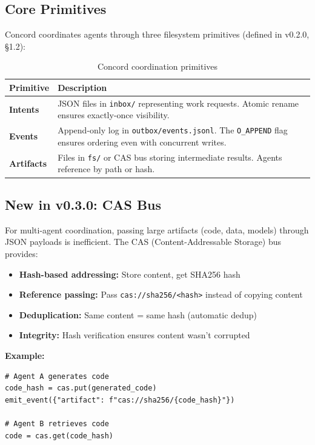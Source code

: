 \documentclass[11pt]{article}
\begin{document}
\subsection{Core Primitives}

Concord coordinates agents through three filesystem primitives (defined in v0.2.0, §1.2):

\begin{table}[h]
\centering
\begin{tabular}{p{3cm}p{10cm}}
\toprule
\textbf{Primitive} & \textbf{Description} \\
\midrule
\textbf{Intents} & JSON files in \texttt{inbox/} representing work requests. Atomic rename ensures exactly-once visibility. \\
\textbf{Events} & Append-only log in \texttt{outbox/events.jsonl}. The \texttt{O\_APPEND} flag ensures ordering even with concurrent writes. \\
\textbf{Artifacts} & Files in \texttt{fs/} or CAS bus storing intermediate results. Agents reference by path or hash. \\
\bottomrule
\end{tabular}
\caption{Concord coordination primitives}
\end{table}

\subsection{New in v0.3.0: CAS Bus}

For multi-agent coordination, passing large artifacts (code, data, models) through JSON payloads is inefficient. The CAS (Content-Addressable Storage) bus provides:

\begin{itemize}
\item \textbf{Hash-based addressing:} Store content, get SHA256 hash
\item \textbf{Reference passing:} Pass \texttt{cas://sha256/<hash>} instead of copying content
\item \textbf{Deduplication:} Same content = same hash (automatic dedup)
\item \textbf{Integrity:} Hash verification ensures content wasn't corrupted
\end{itemize}

\textbf{Example:}
\begin{lstlisting}
# Agent A generates code
code_hash = cas.put(generated_code)
emit_event({"artifact": f"cas://sha256/{code_hash}"})

# Agent B retrieves code
code = cas.get(code_hash)
\end{lstlisting}
\end{document}
